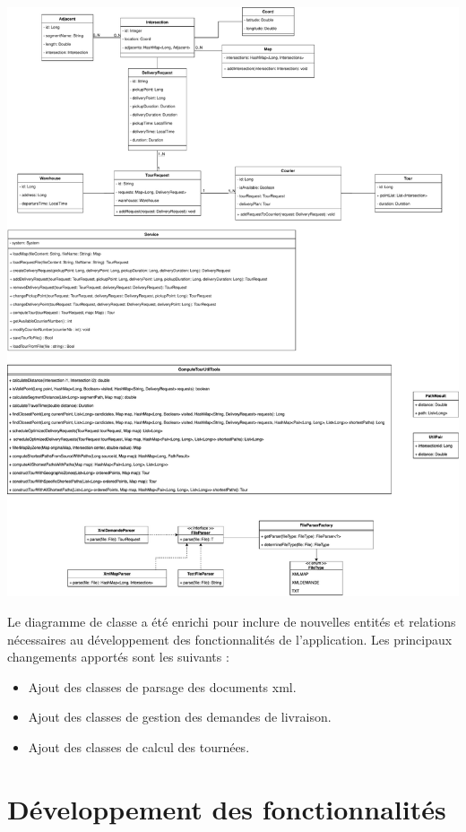\documentclass[a4paper]{article}
\begin{document}
\begin{center}
    \includegraphics[width=\textwidth]{images/class.pdf}
\end{center}

Le diagramme de classe a été enrichi pour inclure de nouvelles entités et relations nécessaires au développement des fonctionnalités de l'application. Les principaux changements apportés sont les suivants :
\begin{itemize}
    \item Ajout des classes de parsage des documents xml.
    \item Ajout des classes de gestion des demandes de livraison.
    \item Ajout des classes de calcul des tournées.
\end{itemize}

\section{Développement des fonctionnalités}
\end{document}
